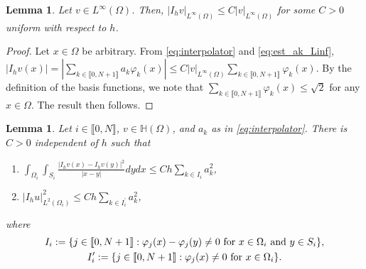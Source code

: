 \documentclass[11 pt]{article}
\newcommand\inter[1]{\llbracket #1\rrbracket}
\newtheorem{lemma}[theorem]{Lemma}
\numberwithin{equation}{section}
\begin{document}
\begin{lemma}\label{lem:inter_l_infty}
    Let $v\in L^\infty(\Omega)$. Then, $|I_h v|_{L^\infty(\Omega)}\leq C|v|_{L^\infty(\Omega)}$ for some $C>0$ uniform with respect to $h$.
\end{lemma}
%
\begin{proof}
Let $x\in \Omega$ be arbitrary. From \eqref{eq:interpolator} and \eqref{eq:est_ak_Linf}, $
    |I_h v(x)|=\left|\sum_{k\in\inter{0,N+1}}a_k \varphi_k(x)\right| \leq C|v|_{L^\infty(\Omega)}\sum_{k\in\inter{0,N+1}}\varphi_k(x).$
By the definition of the basis functions, we note that $\sum_{k\in\inter{0,N+1}}\varphi_k(x)\leq \sqrt{2}$ for any $x\in\Omega$. The result then follows.
\end{proof}

\begin{lemma}\label{lem:loc_norm_interp}
Let $i\in\inter{0,N}$, $v\in \mathbb H(\Omega)$, and $a_k$ as in \eqref{eq:interpolator}.  There is $C>0$ independent of $h$ such that
%
\begin{enumerate}[label=\upshape(\roman*)]
\item $\displaystyle \int_{\Omega_i}\int_{S_i}\frac{|I_hv(x)-I_hv(y)|^2}{|x-y|}dy dx\leq Ch\sum_{k\in I_i} a_k^2$,
\item  $\displaystyle |I_h u|^2_{L^2(\Omega_i)}\leq Ch\sum_{k\in I_i^\prime} a_k^2$,
\end{enumerate}
where
%
\begin{gather}\label{def_Ii}
I_i:=\{j\in\inter{0,N+1}:\varphi_j(x)-\varphi_j(y) \neq 0 \ \textnormal{for $x\in \Omega_i$ and $y\in S_i$}\}, \\ \label{def_Iiprime}
I^\prime_i:=\{j\in\inter{0,N+1}:\varphi_j(x)\neq 0 \ \textnormal{for $x\in \Omega_i$}\}.
\end{gather}
%
\end{lemma}
\end{document}
